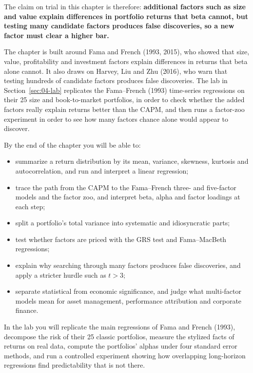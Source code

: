 The claim on trial in this chapter is therefore: \textbf{additional factors such as size and value explain differences in portfolio returns that beta cannot, but testing many candidate factors produces false discoveries, so a new factor must clear a higher bar.}

The chapter is built around Fama and French (1993, 2015), who showed that size, value, profitability and investment factors explain differences in returns that beta alone cannot. It also draws on Harvey, Liu and Zhu (2016), who warn that testing hundreds of candidate factors produces false discoveries. The lab in Section~\ref{sec:04-lab} replicates the Fama--French (1993) time-series regressions on their 25 size and book-to-market portfolios, in order to check whether the added factors really explain returns better than the CAPM, and then runs a factor-zoo experiment in order to see how many factors chance alone would appear to discover.

By the end of the chapter you will be able to:
\begin{itemize}
  \item summarize a return distribution by its mean, variance, skewness, kurtosis and autocorrelation, and run and interpret a linear regression;
  \item trace the path from the CAPM to the Fama--French three- and five-factor models and the factor zoo, and interpret beta, alpha and factor loadings at each step;
  \item split a portfolio's total variance into systematic and idiosyncratic parts;
  \item test whether factors are priced with the GRS test and Fama--MacBeth regressions;
  \item explain why searching through many factors produces false discoveries, and apply a stricter hurdle such as $t > 3$;
  \item separate statistical from economic significance, and judge what multi-factor models mean for asset management, performance attribution and corporate finance.
\end{itemize}

In the lab you will replicate the main regressions of Fama and French (1993), decompose the risk of their 25 classic portfolios, measure the stylized facts of returns on real data, compute the portfolios' alphas under four standard error methods, and run a controlled experiment showing how overlapping long-horizon regressions find predictability that is not there.


